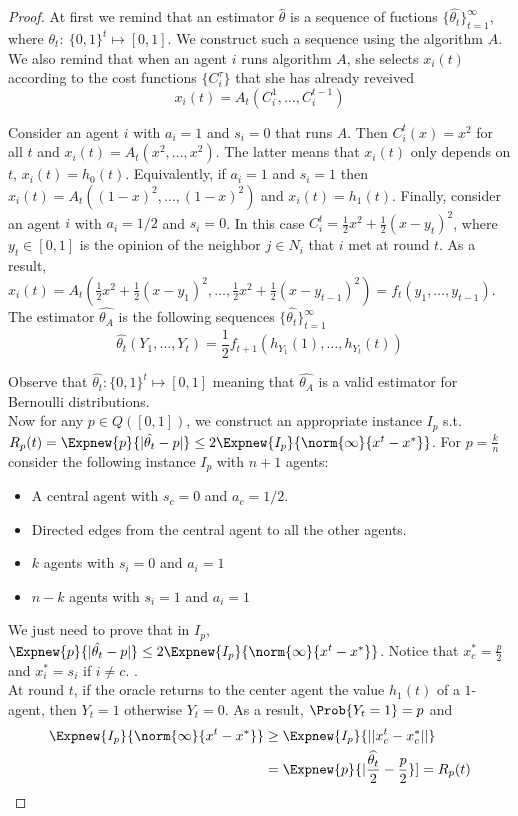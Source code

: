 \begin{proof}
At first we remind that an estimator $\hat{\theta}$ is a sequence of fuctions $\{\hat{\theta_t}\}_{t=1}^{\infty}$, where $\theta_t:~\{0,1\}^t\mapsto [0,1]$.  We construct such a sequence using the algorithm $A$.
We also remind that when an agent $i$ runs algorithm $A$, she selects $x_i(t)$ according to the cost functions $\{C_i^{\tau}\}$ that she has already reveived \[x_i(t)=A_t(C_i^1,\ldots,C_i^{t-1})\]

\noindent Consider an agent $i$ with $a_i=1$ and $s_i=0$ that runs $A$. Then $C_i^t(x)=x^2$ for all $t$ and $x_i(t)=A_t(x^2,\ldots,x^2)$.
The latter means that $x_i(t)$ only depends on $t$, $x_i(t)=h_0(t)$. Equivalently, if $a_i=1$ and $s_i=1$ then $x_i(t)=A_t((1-x)^2,\ldots,(1-x)^2)$ and $x_i(t)=h_1(t)$. Finally, consider an agent $i$ with $a_i=1/2$ and $s_i=0$. In this case $C_i^t = \frac{1}{2}x^2 + \frac{1}{2}(x-y_t)^2$, where $y_t \in [0,1]$ is the opinion of the neighbor $j\in N_i$ that $i$ met at 
round $t$. As a result, $x_i(t)=A_t(\frac{1}{2}x^2+\frac{1}{2}(x-y_1)^2,\ldots,\frac{1}{2}x^2+\frac{1}{2}(x-y_{t-1})^2)=f_t(y_1,\ldots,y_{t-1})$. The estimator $\hat{\theta_A}$ is the following sequences $\{\hat{\theta_{t}}\}_{t=1}^{\infty}$ \[\hat{\theta_t}(Y_1,\ldots,Y_t) = \frac{1}{2}f_{t+1}(h_{Y_1}(1),\ldots,h_{Y_t}(t)) \]

\noindent Observe that $\hat{\theta_t}: \{0,1\}^t \mapsto [0,1]$ meaning that $\hat{\theta_A}$ is a valid estimator for Bernoulli distributions.\\

\noindent Now for any $p \in Q([0,1])$, we construct an appropriate instance $I_p$ s.t. $R_p(t)=\Expnew{p}{|\hat{\theta_t} - p|} \leq 2\Expnew{I_p}{\norm{\infty}{x^t-x^*}}$.
For $p=\frac{k}{n}$ consider the following instance $I_p$ with $n+1$ agents:
\begin{itemize}
 \item A central agent with $s_c=0$ and $a_c=1/2$.
 \item Directed edges from the central agent to all the other agents.
 \item $k$ agents with $s_i=0$ and $a_i=1$
 \item $n-k$ agents with $s_i=1$ and $a_i=1$
 \end{itemize}
We just need to prove that in $I_p$, $\Expnew{p}{|\hat{\theta_t}-p|} \leq 2\Expnew{I_p}{\norm{\infty}{x^t-x^*}}$. Notice that $x^*_c=\frac{p}{2}$ and $x^*_i=s_i$ if $i\neq c$. .\\
At round $t$, if the oracle returns to the center agent the value $h_1(t)$ of a $1$-agent, then $Y_t=1$ otherwise $Y_t=0$. As a result, $\Prob{Y_t=1}=p$ and 
\begin{align*}
 \Expnew{I_p}{\norm{\infty}{x^t-x^*}} &\geq \Expnew{I_p}{||x^t_c-x^*_c||}\\
 &= \Expnew{p}{|\frac{\widehat{\theta_t}}{2}-\frac{p}{2}}] = R_p(t)
\end{align*}
\end{proof}

